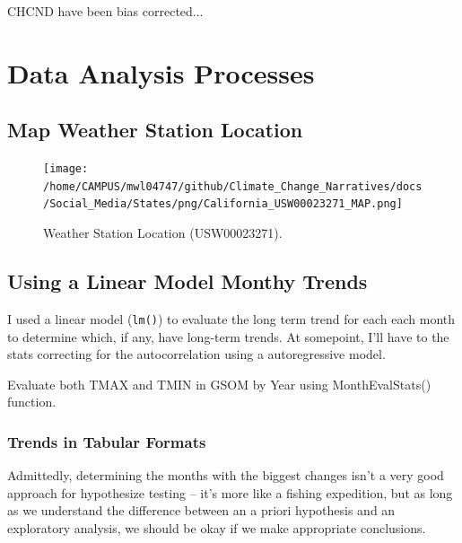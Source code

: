 \documentclass{article}
\begin{document}
CHCND have been bias corrected...


\section{Data Analysis Processes}

\subsection{Map Weather Station Location}






\begin{figure}
\texttt{[image: /home/CAMPUS/mwl04747/github/Climate\_Change\_Narratives/docs/Social\_Media/States/png/California\_USW00023271\_MAP.png]}
\caption{Weather Station Location (USW00023271). }
\label{fig:Map}
\end{figure}

\subsection{Using a Linear Model Monthy Trends}

I used a linear model (\texttt{lm()}) to evaluate the long term trend for each each month to determine which, if any, have long-term trends. At somepoint, I'll have to the stats correcting for the autocorrelation using a autoregressive model.  



Evaluate both TMAX and TMIN in GSOM by Year using MonthEvalStats() function. 

\begin{knitrout}
\color{fgcolor}\begin{kframe}


{\ttfamily\noindent\bfseries\color{errorcolor}{\#\# Error in is.data.frame(data): object 'GSOM' not found}}\end{kframe}
\end{knitrout}


\subsubsection{Trends in Tabular Formats}

Admittedly, determining the months with the biggest changes isn't a very good approach for hypothesize testing -- it's more like a fishing expedition, but as long as we understand the difference between an a priori hypothesis and an exploratory analysis, we should be okay if we make appropriate conclusions. 
\end{document}
